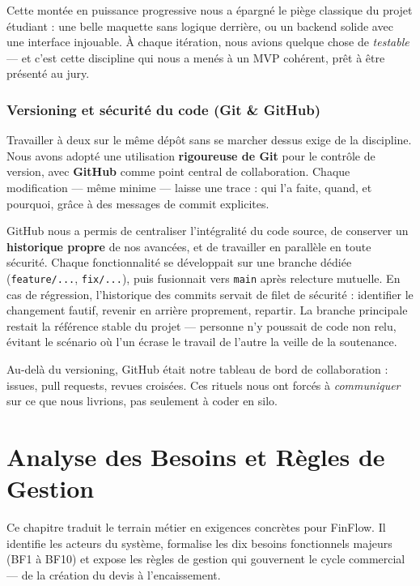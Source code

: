 \documentclass[12pt,a4paper]{report}
\begin{document}
Cette montée en puissance progressive nous a épargné le piège classique du projet étudiant : une belle maquette sans logique derrière, ou un backend solide avec une interface injouable. À chaque itération, nous avions quelque chose de \emph{testable} --- et c'est cette discipline qui nous a menés à un MVP cohérent, prêt à être présenté au jury.

\subsection{Versioning et sécurité du code (Git \& GitHub)}

Travailler à deux sur le même dépôt sans se marcher dessus exige de la discipline. Nous avons adopté une utilisation \textbf{rigoureuse de Git} pour le contrôle de version, avec \textbf{GitHub} comme point central de collaboration. Chaque modification --- même minime --- laisse une trace : qui l'a faite, quand, et pourquoi, grâce à des messages de commit explicites.

GitHub nous a permis de centraliser l'intégralité du code source, de conserver un \textbf{historique propre} de nos avancées, et de travailler en parallèle en toute sécurité. Chaque fonctionnalité se développait sur une branche dédiée (\texttt{feature/...}, \texttt{fix/...}), puis fusionnait vers \texttt{main} après relecture mutuelle. En cas de régression, l'historique des commits servait de filet de sécurité : identifier le changement fautif, revenir en arrière proprement, repartir. La branche principale restait la référence stable du projet --- personne n'y poussait de code non relu, évitant le scénario où l'un écrase le travail de l'autre la veille de la soutenance.

Au-delà du versioning, GitHub était notre tableau de bord de collaboration : issues, pull requests, revues croisées. Ces rituels nous ont forcés à \emph{communiquer} sur ce que nous livrions, pas seulement à coder en silo.

\chapter{Analyse des Besoins et Règles de Gestion}
\label{ch:besoins}

Ce chapitre traduit le terrain métier en exigences concrètes pour FinFlow. Il identifie les acteurs du système, formalise les dix besoins fonctionnels majeurs (BF1 à BF10) et expose les règles de gestion qui gouvernent le cycle commercial --- de la création du devis à l'encaissement.
\end{document}
